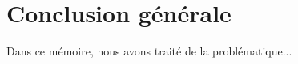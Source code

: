 \documentclass[a4paper,11pt,twoside]{memoir}
\begin{document}
\chapter*{Conclusion générale}
\adjustmtc
{} 

Dans ce mémoire, nous avons traité de la problématique...



\cleardoublepage{}
 

\appendix
\cleardoublepage{}





\cleardoublepage %
\printindex %

\end{document}
